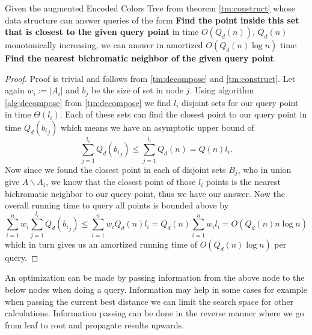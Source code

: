 \documentclass[a4paper,UKenglish,cleveref, autoref, thm-restate]{lipics-v2021}
\begin{document}
\begin{theorem}\label{tm:query}
Given the augmented Encoded Colors Tree from theorem \ref{tm:construct} whose data structure can answer queries of the form {\bf Find the point inside this set that is closest to the given query point} in time $O\left(Q_d(n)\right)$, $Q_d(n)$ monotonically increasing, we can answer in amortized $O\left(Q_d(n) \log n\right)$ time {\bf Find the nearest bichromatic neighbor of the given query point}.
\end{theorem}
\begin{proof}
Proof is trivial and follows from \ref{tm:decompose} and \ref{tm:construct}.
Let again $w_i := |A_i|$ and $b_j$ be the size of set in node $j$.
Using algorithm \ref{alg:decompose} from \ref{tm:decompose} we find $l_i$ disjoint sets for our query point in time $\Theta\left(l_i\right)$.
Each of these sets can find the closest point to our query point in time $Q_d\left({b_i}_j\right)$ which means we have an asymptotic upper bound of
$$ \sum\limits_{j = 1}^{l_i} Q_d\left({b_i}_j\right) \leq \sum\limits_{j = 1}^{l_i}Q_d\left(n\right) = Q\left(n\right)l_i. $$
Now since we found the closest point in each of disjoint sets $B_j$, who in union give $A\backslash A_i$, we know that the closest point of those $l_i$ points is the nearest bichromatic neighbor to our query point, thus we have our answer.
Now the overall running time to query all points is bounded above by
$$ \sum\limits_{i = 1}^n w_i \sum\limits_{j = 1}^{l_i} Q_d\left({b_i}_j\right)
    \leq \sum\limits_{i = 1}^n w_iQ_d\left(n\right)l_i = Q_d\left(n\right) \sum\limits_{i = 1}^n w_il_i = O\left(Q_d(n)n\log n\right) $$
which in turn gives us an amortized running time of $O\left(Q_d(n)\log n\right)$ per query.
\end{proof}

\begin{remark}
An optimization can be made by passing information from the above node to the below nodes when doing a query.
Information may help in some cases for example when passing the current best distance we can limit the search space for other calculations.
Information passing can be done in the reverse manner where we go from leaf to root and propagate results upwards.
\end{remark}
\end{document}
